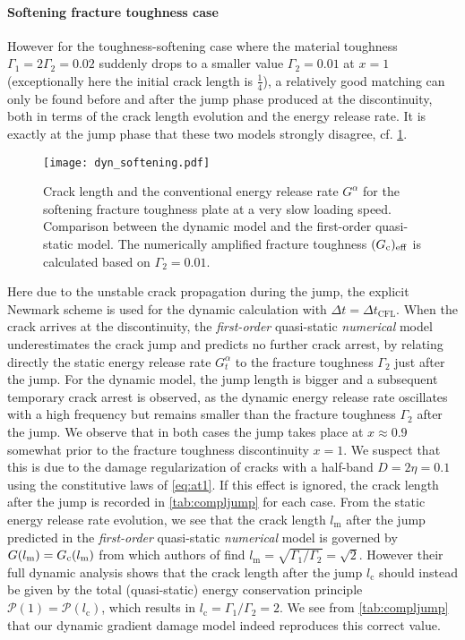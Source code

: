 \paragraph{Softening fracture toughness case} However for the toughness-softening case where the material toughness $\Gamma_1=2\Gamma_2=0.02$ suddenly drops to a smaller value $\Gamma_2=0.01$ at $x=1$ (exceptionally here the initial crack length is $\frac{1}{4}$), a relatively good matching can only be found before and after the jump phase produced at the discontinuity, both in terms of the crack length evolution and the energy release rate. It is exactly at the jump phase that these two models strongly disagree, cf. \cref{eq:ressoftening}.
\begin{figure}[htbp]
\centering
\texttt{[image: dyn\_softening.pdf]}
\caption{Crack length and the conventional energy release rate $G^\alpha$ for the softening fracture toughness plate at a very slow loading speed. Comparison between the dynamic model and the first-order quasi-static model. The numerically amplified fracture toughness $(G_\mathrm{c})_\mathrm{eff}$ is calculated based on $\Gamma_2=0.01$.} \label{eq:ressoftening}
\end{figure}
Here due to the unstable crack propagation during the jump, the explicit Newmark scheme is used for the dynamic calculation with $\Delta t=\Delta t_\mathrm{CFL}$. When the crack arrives at the discontinuity, the \emph{first-order} quasi-static \emph{numerical} model underestimates the crack jump and predicts no further crack arrest, by relating directly the static energy release rate $G^\alpha_t$ to the fracture toughness $\Gamma_2$ just after the jump. For the dynamic model, the jump length is bigger and a subsequent temporary crack arrest is observed, as the dynamic energy release rate oscillates with a high frequency but remains smaller than the fracture toughness $\Gamma_2$ after the jump. We observe that in both cases the jump takes place at $x\approx 0.9$ somewhat prior to the fracture toughness discontinuity $x=1$. We suspect that this is due to the damage regularization of cracks with a half-band $D=2\eta=0.1$ using the constitutive laws of \eqref{eq:at1}. If this effect is ignored, the crack length after the jump is recorded in \cref{tab:compljump} for each case. From the static energy release rate evolution, we see that the crack length $l_\mathrm{m}$ after the jump predicted in the \emph{first-order} quasi-static \emph{numerical} model is governed by $G(l_\mathrm{m})=G_\mathrm{c}(l_\mathrm{m})$ from which authors of \cite{DumouchelMarigoCharlotte:2008} find $l_\mathrm{m}=\sqrt{\Gamma_1/\Gamma_2}=\sqrt{2}$. However their full dynamic analysis shows that the crack length after the jump $l_\mathrm{c}$ should instead be given by the total (quasi-static) energy conservation principle $\mathcal{P}(1)=\mathcal{P}(l_\mathrm{c})$, which results in $l_\mathrm{c}=\Gamma_1/\Gamma_2=2$. We see from \cref{tab:compljump} that our dynamic gradient damage model indeed reproduces this correct value.

